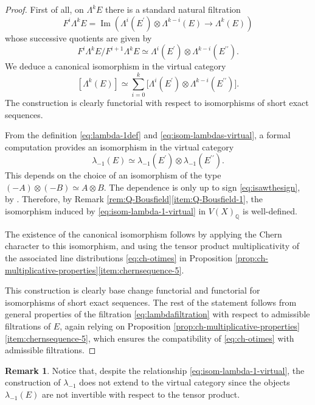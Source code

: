 \documentclass[JEP,XML,SOM,Unicode,published]{cedram}
\theoremstyle{plain}
\theoremstyle{definition}
\newtheorem{remark}[theorem]{Remark}
\newcommand{\QBbb}{\mathbb Q}
\newcommand{\bis}{\prime\prime}
\DeclareMathOperator{\Imag}{Im}
\begin{document}
\begin{proof}

First of all, on $\Lambda^k E$ there is a standard natural filtration
\begin{displaymath} F^i \Lambda^k E =\Imag ( \Lambda^{i} (E^{\prime}) \otimes \Lambda^{k-i}(E) \to \Lambda^k (E))
\end{displaymath} whose successive quotients are given by
\begin{equation}\label{eq:lambdafiltration}
F^i\Lambda^k E/F^{i+1}\Lambda^k E \simeq \Lambda^{i} (E^{\prime}) \otimes \Lambda^{k-i} (E^{\bis}).
\end{equation}
We deduce a canonical isomorphism in the virtual category
\begin{equation}\label{eq:isom-lambdas-virtual}
[\Lambda^k (E)] \simeq \sum_{i=0}^k \bigl[ \Lambda^{i} (E^{\prime}) \otimes \Lambda^{k-i} (E^{\bis}) \bigr].
\end{equation}
The construction is clearly functorial with respect to isomorphisms of short exact sequences.

From the definition \eqref{eq:lambda-1def} and \eqref{eq:isom-lambdas-virtual}, a formal computation provides an isomorphism in the virtual category
\begin{equation}\label{eq:isom-lambda-1-virtual}
\lambda_{-1}(E) \simeq \lambda_{-1}(E^{\prime}) \otimes \lambda_{-1}(E^{\bis}).
\end{equation}
This depends on the choice of an isomorphism of the type $(-A) \otimes (-B) \simeq A \otimes B$. The dependence is only up to sign \eqref{eq:isawthesign}, by \cite[ (b)]{Deligne-determinant}. Therefore, by Remark \ref{rem:Q-Bousfield}\eqref{item:Q-Bousfield-1}, the isomorphism induced by \eqref{eq:isom-lambda-1-virtual} in $V(X)_{\QBbb}$ is well-defined.

The existence of the canonical isomorphism follows by applying the Chern character to this isomorphism, and using the tensor product multiplicativity of the associated line distributions \eqref{eq:ch-otimes} in Proposition \ref{prop:ch-multiplicative-properties}\eqref{item:chernsequence-5}.

This construction is clearly base change functorial and functorial for isomorphisms of short exact sequences. The rest of the statement follows from general properties of the filtration \eqref{eq:lambdafiltration} with respect to admissible filtrations of $E$, again relying on Proposition \ref{prop:ch-multiplicative-properties}\eqref{item:chernsequence-5}, which ensures the compatibility of \eqref{eq:ch-otimes} with admissible filtrations.
\end{proof}
\begin{remark}
Notice that, despite the relationship \eqref{eq:isom-lambda-1-virtual}, the construction of $\lambda_{-1}$ does not extend to the virtual category since the objects $\lambda_{-1}(E)$ are not invertible with respect to the tensor product.
\end{remark}
\end{document}
